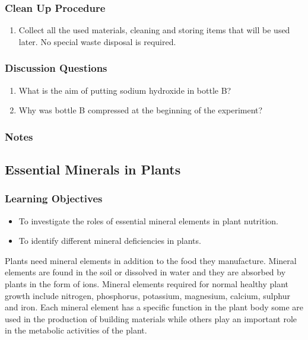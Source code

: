 \subsubsection*{Clean Up Procedure}
\begin{enumerate}
\item{Collect all the used materials, cleaning and storing items that will be used later. No special waste disposal is required.}
\end{enumerate}

\subsubsection*{Discussion Questions}
\begin{enumerate}
\item{What is the aim of putting sodium hydroxide in bottle B?}
\item{Why was bottle B compressed at the beginning of the experiment?}
\end{enumerate}

\subsubsection*{Notes}

\subsection{Essential Minerals in Plants}

\subsubsection*{Learning Objectives}
\begin{itemize}
\item{To investigate the roles of essential mineral elements in plant nutrition.}
\item{To identify different mineral deficiencies in plants.}
\end{itemize}


Plants need mineral elements in addition to the food they manufacture. Mineral elements are found in the soil or dissolved in water and they are absorbed by plants in the form of ions. Mineral elements required for normal healthy plant growth include nitrogen, phosphorus, potassium, magnesium, calcium, sulphur and iron. Each mineral element has a specific function in the plant body some are used in the production of building materials while others play an important role in the metabolic activities of the plant.

